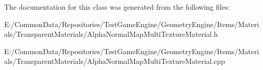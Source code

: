 The documentation for this class was generated from the following files\+:\begin{DoxyCompactItemize}
\item 
E\+:/\+Common\+Data/\+Repositories/\+Test\+Game\+Engine/\+Geometry\+Engine/\+Items/\+Materials/\+Transparent\+Materials/Alpha\+Normal\+Map\+Multi\+Texture\+Material.\+h\item 
E\+:/\+Common\+Data/\+Repositories/\+Test\+Game\+Engine/\+Geometry\+Engine/\+Items/\+Materials/\+Transparent\+Materials/Alpha\+Normal\+Map\+Multi\+Texture\+Material.\+cpp\end{DoxyCompactItemize}
